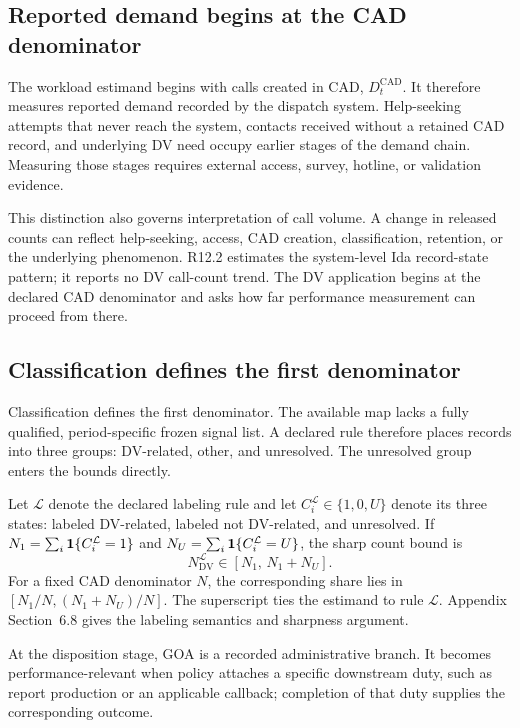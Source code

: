 \documentclass[11pt]{article}
\begin{document}
\subsection{Reported demand begins at the CAD denominator}

The workload estimand begins with calls created in CAD, $D_t^{\mathrm{CAD}}$. It therefore measures reported demand recorded by the dispatch system. Help-seeking attempts that never reach the system, contacts received without a retained CAD record, and underlying DV need occupy earlier stages of the demand chain. Measuring those stages requires external access, survey, hotline, or validation evidence.

This distinction also governs interpretation of call volume. A change in released counts can reflect help-seeking, access, CAD creation, classification, retention, or the underlying phenomenon. R12.2 estimates the system-level Ida record-state pattern; it reports no DV call-count trend. The DV application begins at the declared CAD denominator and asks how far performance measurement can proceed from there.

\subsection{Classification defines the first denominator}

Classification defines the first denominator. The available map lacks a fully qualified, period-specific frozen signal list. A declared rule therefore places records into three groups: DV-related, other, and unresolved. The unresolved group enters the bounds directly.

Let $\mathcal L$ denote the declared labeling rule and let $C_i^{\mathcal L}\in\{1,0,U\}$ denote its three states: labeled DV-related, labeled not DV-related, and unresolved. If $N_1=\sum_i\mathbf{1}\{C_i^{\mathcal L}=1\}$ and $N_U=\sum_i\mathbf{1}\{C_i^{\mathcal L}=U\}$, the sharp count bound is
\begin{equation}
N_{\mathrm{DV}}^{\mathcal L}\in[N_1,\,N_1+N_U].
\label{eq:dv_bounds}
\end{equation}
For a fixed CAD denominator $N$, the corresponding share lies in $[N_1/N,(N_1+N_U)/N]$. The superscript ties the estimand to rule $\mathcal L$. Appendix Section~6.8 gives the labeling semantics and sharpness argument.

At the disposition stage, GOA is a recorded administrative branch. It becomes performance-relevant when policy attaches a specific downstream duty, such as report production or an applicable callback; completion of that duty supplies the corresponding outcome.
\end{document}
